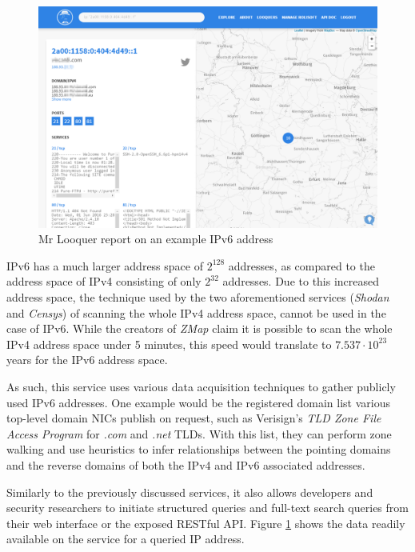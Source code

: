 \documentclass[a4paper,12pt]{article}
\begin{document}
	\begin{figure}[!htbp]
		\centering
		\includegraphics[scale=0.355]{looquer.png}
		\caption{Mr Looquer report on an example IPv6 address}
		\label{looquerscr}
	\end{figure}
	
	IPv6 has a much larger address space of $ 2^{128} $ addresses, as compared to the address space of IPv4 consisting of only $ 2^{32} $ addresses. Due to this increased address space, the technique used by the two aforementioned services (\textit{Shodan} and \textit{Censys}) of scanning the whole IPv4 address space, cannot be used in the case of IPv6. While the creators of \textit{ZMap} claim it is possible to scan the whole IPv4 address space under 5 minutes\cite{zmap13}, this speed would translate to $ 7.537 \cdot 10^{23} $ years for the IPv6 address space.
	
	As such, this service uses various data acquisition techniques to gather publicly used IPv6 addresses. One example would be the registered domain list various top-level domain NICs publish on request, such as Verisign's \textit{TLD Zone File Access Program}\cite{verisign16} for \textit{.com} and \textit{.net} TLDs. With this list, they can perform zone walking and use heuristics to infer relationships between the pointing domains and the reverse domains of both the IPv4 and IPv6 associated addresses.
	
	Similarly to the previously discussed services, it also allows developers and security researchers to initiate structured queries and full-text search queries from their web interface or the exposed RESTful API. Figure \ref{looquerscr} shows the data readily available on the service for a queried IP address.
	
\end{document}
